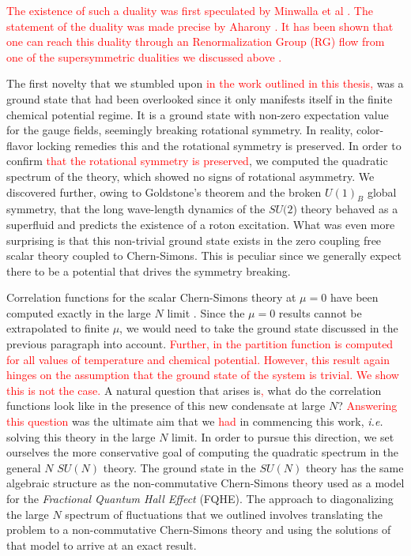 \textcolor{red}{The existence of such a duality was first speculated by Minwalla et al \cite{Giombi:2011kc}. The statement of the duality was made precise by Aharony \cite{Aharony:2015mjs}.  It has been shown that one can reach this duality through an Renormalization Group (RG) flow from one of the supersymmetric dualities we discussed above \cite{Gur-Ari:2015pca}.}


The first novelty that we stumbled upon \textcolor{red}{in the work outlined in this thesis,} was a ground state that had been overlooked since it only manifests itself in the finite chemical potential regime. It is a ground state with non-zero expectation value for the gauge fields, seemingly breaking rotational symmetry. In reality, color-flavor locking remedies this and the rotational symmetry is preserved. In order to confirm \textcolor{red}{that the rotational symmetry is preserved}, we computed the quadratic spectrum of the theory, which showed no signs of rotational asymmetry. We discovered further, owing to Goldstone's theorem and the broken $U(1)_B$ global symmetry, that the long wave-length dynamics of the $SU(2$) theory behaved as a superfluid and predicts the existence of a roton excitation. What was even more surprising is that this non-trivial ground state exists in the zero coupling free scalar theory coupled to Chern-Simons. This is peculiar since we generally expect there to be a potential that drives the symmetry breaking.

Correlation functions for the scalar Chern-Simons theory at $\mu=0$ have been computed exactly in the large $N$ limit \cite{Aharony:2012nh}. Since the $\mu =0$ results cannot be extrapolated to finite $\mu$, we would need to take the ground state discussed in the previous paragraph into account. \textcolor{red}{Further, in \cite{Jain:2013gza} the partition function is computed for all values of temperature and chemical potential. However, this result again hinges on the assumption that the ground state of the system is trivial. We show this is not the case. }A natural question that arises is\textcolor{red}{,} what do the correlation functions look like in the presence of this new condensate at large $N$? \textcolor{red}{Answering this question} was the ultimate aim that we \textcolor{red}{had} in commencing this work, \textit{i.e.} solving this theory in the large $N$ limit. In order to pursue this direction, we set ourselves the more conservative goal of computing the quadratic spectrum in the general $N$ $SU(N)$ theory. The ground state in the $SU(N)$ theory has the same algebraic structure as the non-commutative Chern-Simons theory used as a model for the \textit{Fractional Quantum Hall Effect} (FQHE). The approach to diagonalizing the large $N$ spectrum of fluctuations that we outlined involves translating the problem to a non-commutative Chern-Simons theory and using the solutions of that model to arrive at an exact result.

